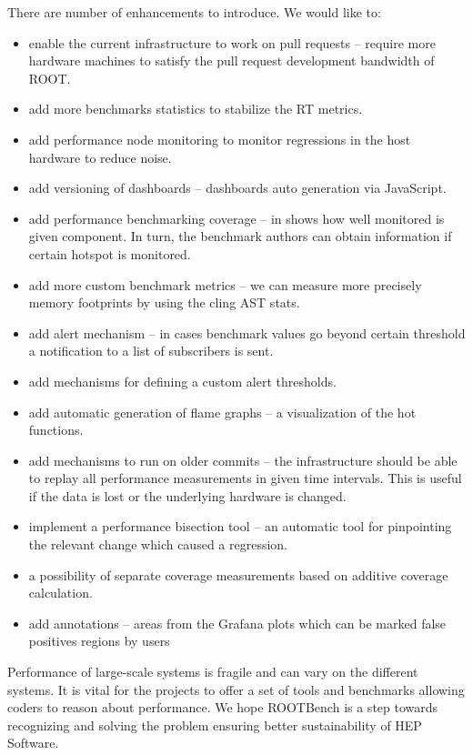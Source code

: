 \documentclass{webofc}
\begin{document}
There are number of enhancements to introduce. We would like to:
\begin{itemize}
  \item enable the current infrastructure to work on pull requests -- require more hardware machines to satisfy the pull request development bandwidth of ROOT.
  \item add more benchmarks statistics to stabilize the RT metrics.
  \item add performance node monitoring to monitor regressions in the host hardware to reduce noise.
  \item add versioning of dashboards -- dashboards auto generation via JavaScript.
  \item add performance benchmarking coverage -- in shows how well monitored is given component. In turn, the benchmark authors can obtain information if certain hotspot is monitored.
  \item add more custom benchmark metrics -- we can measure more precisely memory footprints by using the cling AST stats.
  \item add alert mechanism -- in cases benchmark values go beyond certain threshold a notification to a list of subscribers is sent.
    \item add mechanisms for defining a custom alert thresholds.
    \item add automatic generation of flame graphs -- a visualization of the hot functions.
    \item add mechanisms to run on older commits -- the infrastructure should be able to replay all performance measurements in given time intervals. This is useful if the data is lost or the underlying hardware is changed.
    \item implement a performance bisection tool -- an automatic tool for pinpointing the relevant change which caused a regression.
    \item a possibility of separate coverage measurements based on additive coverage calculation.
    \item add annotations -- areas from the Grafana plots which can be marked false positives regions by users
\end{itemize}


Performance of large-scale systems is fragile and can vary on the different systems. It is vital for the projects to offer a set of tools and benchmarks allowing coders to reason about performance. We hope ROOTBench is a step towards recognizing and solving the problem ensuring better sustainability of HEP Software.
\end{document}
